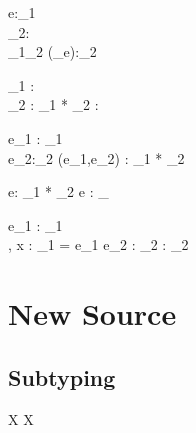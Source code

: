  {\Gamma\vdash{}e:\tau_1 \\
  \Gamma\vdash\tau_2:\star \\ \tau_1\longrightarrow\tau_2} {\Gamma\vdash(_{\downarrow}e):\tau_2}


 {\Gamma \vdash \tau_1 : \star \\
  \Gamma \vdash \tau_2 : \star} {\Gamma \vdash \tau_1 * \tau_2 : \star}


 {\Gamma \vdash e_1 : \tau_1 \\  \Gamma \vdash
  e_2:\tau_2 }
{\Gamma \vdash(e_1,e_2) : \tau_1 * \tau_2}



 {\Gamma \vdash e: \tau_1 * \tau_2}
{\Gamma \vdash \projk e : \tau_}


 {\Gamma\vdash e_1 : \tau_1 \\ \Gamma, x : \tau_1 = e_1 \vdash e_2 : \tau_2}
{\Gamma\vdash {} : \tau_2}


\newpage{}

\section{New Source}


\subsection{Subtyping}


 { } { X \leq X  }

 { } { \star \leq \star {} }

